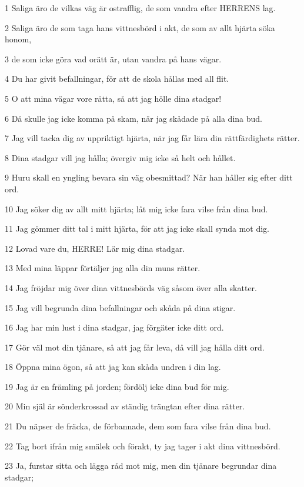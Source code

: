 \par 1 Saliga äro de vilkas väg är ostrafflig, de som vandra efter HERRENS lag.
\par 2 Saliga äro de som taga hans vittnesbörd i akt, de som av allt hjärta söka honom,
\par 3 de som icke göra vad orätt är, utan vandra på hans vägar.
\par 4 Du har givit befallningar, för att de skola hållas med all flit.
\par 5 O att mina vägar vore rätta, så att jag hölle dina stadgar!
\par 6 Då skulle jag icke komma på skam, när jag skådade på alla dina bud.
\par 7 Jag vill tacka dig av uppriktigt hjärta, när jag får lära din rättfärdighets rätter.
\par 8 Dina stadgar vill jag hålla; övergiv mig icke så helt och hållet.
\par 9 Huru skall en yngling bevara sin väg obesmittad? När han håller sig efter ditt ord.
\par 10 Jag söker dig av allt mitt hjärta; låt mig icke fara vilse från dina bud.
\par 11 Jag gömmer ditt tal i mitt hjärta, för att jag icke skall synda mot dig.
\par 12 Lovad vare du, HERRE! Lär mig dina stadgar.
\par 13 Med mina läppar förtäljer jag alla din muns rätter.
\par 14 Jag fröjdar mig över dina vittnesbörds väg såsom över alla skatter.
\par 15 Jag vill begrunda dina befallningar och skåda på dina stigar.
\par 16 Jag har min lust i dina stadgar, jag förgäter icke ditt ord.
\par 17 Gör väl mot din tjänare, så att jag får leva, då vill jag hålla ditt ord.
\par 18 Öppna mina ögon, så att jag kan skåda undren i din lag.
\par 19 Jag är en främling på jorden; fördölj icke dina bud för mig.
\par 20 Min själ är sönderkrossad av ständig trängtan efter dina rätter.
\par 21 Du näpser de fräcka, de förbannade, dem som fara vilse från dina bud.
\par 22 Tag bort ifrån mig smälek och förakt, ty jag tager i akt dina vittnesbörd.
\par 23 Ja, furstar sitta och lägga råd mot mig, men din tjänare begrundar dina stadgar;
